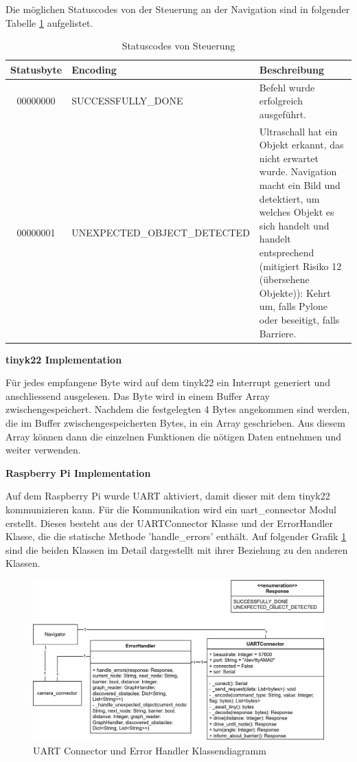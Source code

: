 Die möglichen Statuscodes von der Steuerung an der Navigation sind in folgender Tabelle \ref{table:statuscodes} aufgelistet.

\begin{table}[H]
\centering
\small
\begin{tabularx}{\textwidth}{|c|l|X|}
\hline
  \textbf{Statusbyte} & \textbf{Encoding} & \textbf{Beschreibung} \\
  \hline
      00000000&SUCCESSFULLY\_DONE&Befehl wurde erfolgreich ausgeführt. \\
  \hline
00000001&UNEXPECTED\_OBJECT\_DETECTED &Ultraschall hat ein Objekt erkannt, das nicht erwartet wurde. Navigation macht ein Bild und detektiert, um welches Objekt es sich handelt und handelt entsprechend (mitigiert Risiko 12 (übersehene Objekte)): Kehrt um, falls Pylone oder beseitigt, falls Barriere.\\
  \hline
\end{tabularx}
\caption{Statuscodes von Steuerung}
\label{table:statuscodes}
\end{table}

\textbf{\gls{tinyk22} Implementation}

Für jedes empfangene Byte wird auf dem \gls{tinyk22} ein Interrupt generiert und anschliessend ausgelesen. Das Byte wird in einem Buffer Array zwischengespeichert. Nachdem die festgelegten 4 Bytes angekommen sind werden, die im Buffer zwischengespeicherten Bytes, in ein Array geschrieben. Aus diesem Array können dann die einzelnen Funktionen die nötigen Daten entnehmen und weiter verwenden.

\textbf{Raspberry Pi Implementation}
\label{raspi-uart}

Auf dem Raspberry Pi wurde UART aktiviert, damit dieser mit dem \gls{tinyk22} kommunizieren kann.
Für die Kommunikation wird ein uart\_connector Modul erstellt. Dieses besteht aus der UARTConnector Klasse und der ErrorHandler Klasse, die die statische Methode 'handle\_errors' enthält. Auf folgender Grafik \ref{fig:uart-connector-nav} sind die beiden Klassen im Detail dargestellt mit ihrer Beziehung zu den anderen Klassen.

\begin{figure}[H]
\centering
\includegraphics[width=\textwidth]{assets/IT/robot-sw-architecture-uart-connector.png}
\caption{UART Connector und Error Handler Klassendiagramm}
\label{fig:uart-connector-nav}
\end{figure}

